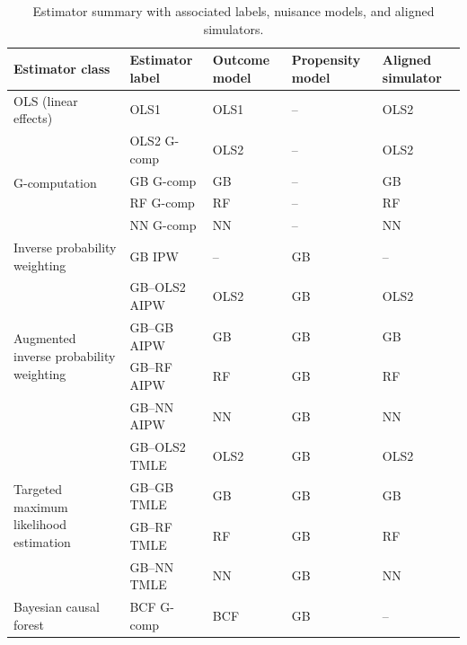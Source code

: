 \begin{table}[!t]
\centering
\caption{Estimator summary with associated labels, nuisance models, and aligned simulators.}
\label{tab:estimators}
{

\begin{tabular}{p{3.2cm}llll}
\toprule
Estimator class & Estimator label & Outcome model & Propensity model & Aligned simulator \\
\midrule
OLS (linear effects) & OLS1 & OLS1 & -- & OLS2 \\
\midrule
\multirow{4}{3.2cm}{G-computation} & OLS2 G-comp & OLS2 & -- & OLS2 \\
& GB G-comp & GB & -- & GB \\
& RF G-comp & RF & -- & RF \\
& NN G-comp & NN & -- & NN \\
\midrule
Inverse probability weighting & GB IPW & -- & GB & -- \\
\midrule
\multirow{4}{3.2cm}{Augmented inverse probability weighting} & GB--OLS2 AIPW & OLS2 & GB & OLS2 \\
& GB--GB AIPW & GB & GB & GB \\
& GB--RF AIPW & RF & GB & RF \\
& GB--NN AIPW & NN & GB & NN \\
\midrule
\multirow{4}{3.2cm}{Targeted maximum likelihood estimation} & GB--OLS2 TMLE & OLS2 & GB & OLS2 \\
& GB--GB TMLE & GB & GB & GB \\
& GB--RF TMLE & RF & GB & RF \\
& GB--NN TMLE & NN & GB & NN \\
\midrule
Bayesian causal forest & BCF G-comp & BCF & GB & -- \\
\bottomrule
\end{tabular}
}
\end{table}
